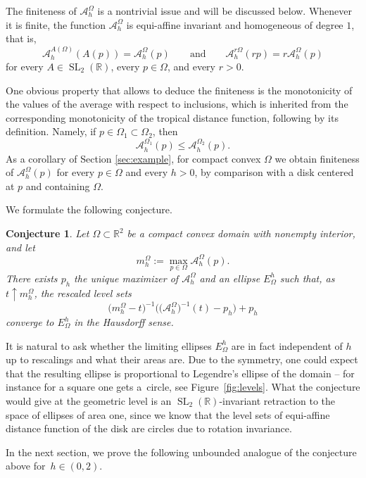 \documentclass[pdftex]{sigma}
\numberwithin{equation}{section}
\newtheorem{Conjecture}[Theorem]{Conjecture}
\theoremstyle{definition}
\begin{document}
The finiteness of $\mathcal{A}_{h}^\Omega$ is a nontrivial issue and will be discussed below. Whenever it is finite, the function $\mathcal{A}_{h}^\Omega$ is equi-affine invariant and homogeneous of degree $1$, that is,
\[
\mathcal{A}_{h}^{A(\Omega)}(A(p))=\mathcal{A}_{h}^{\Omega}(p)
\qquad\text{and}\qquad
\mathcal{A}_{h}^{r\Omega}(rp)=r \mathcal{A}_{h}^{\Omega}(p)
\]
for every $A\in\operatorname{SL}_2(\mathbb{R})$, every $p\in\Omega$, and every $r>0$.

One obvious property that allows to deduce the finiteness is the monotonicity of the values of the average with respect to inclusions, which is inherited from the corresponding monotonicity of the tropical distance function, following by its definition. Namely, if $p\in\Omega_1\subset\Omega_2$, then \[\mathcal{A}_{h}^{\Omega_1}(p)\leq\mathcal{A}_{h}^{\Omega_2}(p).\] As a corollary of Section \ref{sec:example}, for compact convex
$\Omega$ we obtain finiteness of $\mathcal A_h^\Omega(p)$ for every
$p\in\Omega$ and every $h>0$, by comparison with a disk centered at $p$
and containing $\Omega$.

We formulate the following conjecture.

\begin{Conjecture}
Let $\Omega\subset\mathbb{R}^2$ be a compact convex domain with nonempty interior, and let
\[
m_h^\Omega:=\max_{p\in\Omega}\mathcal A_h^\Omega(p).
\]
There exists $p_h$ the unique maximizer of $\mathcal A_h^\Omega$ and an ellipse $E_\Omega^h$ such that, as $t\uparrow m_h^\Omega$, the rescaled level sets \[\bigl(m_h^\Omega-t\bigr)^{-1}\bigl(\bigl(\mathcal A_h^\Omega\bigr)^{-1}(t)-p_h\bigr)+p_h\]
converge to $E_\Omega^h$ in the Hausdorff sense.
\end{Conjecture}

It is natural to ask whether the limiting ellipses $E_\Omega^h$ are in fact independent of $h$ up to rescalings and what their areas are. Due to the symmetry, one could expect that the resulting ellipse is proportional to Legendre's ellipse of the domain -- for instance for a square one gets a~circle, see Figure~\ref{fig:levels}. What the conjecture would give at the geometric level is an $\operatorname{SL}_2(\mathbb{R})$-invariant retraction to the space of ellipses of area one, since we know that the level sets of equi-affine distance function of the disk are circles due to rotation invariance.

In the next section, we prove the following unbounded analogue of the conjecture above for~${h\in(0,2)}$.
\end{document}
